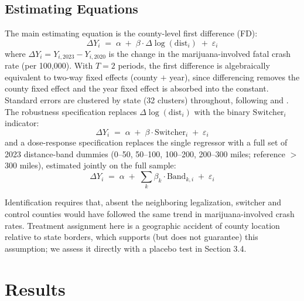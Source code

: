 \documentclass[11pt]{article}
\begin{document}
\subsection{Estimating Equations}

The main estimating equation is the county-level first difference
(FD):
\begin{equation}
  \Delta Y_i \;=\; \alpha \;+\; \beta \cdot \Delta\log(\mathrm{dist}_i) \;+\; \varepsilon_i
  \label{eq:main}
\end{equation}
where $\Delta Y_i = Y_{i,2023} - Y_{i,2020}$ is the change in the
marijuana-involved fatal crash rate (per 100,000). With $T=2$ periods,
the first difference is algebraically equivalent to two-way fixed
effects (county $+$ year), since differencing removes the county
fixed effect and the year fixed effect is absorbed into the constant.
Standard errors are clustered by state (32 clusters) throughout,
following \citet{BertrandDufloMullainathan2004} and
\citet{CameronMiller2015}. The robustness specification replaces
$\Delta\log(\mathrm{dist}_i)$ with the binary $\mathrm{Switcher}_i$
indicator:
\begin{equation}
  \Delta Y_i \;=\; \alpha \;+\; \beta \cdot \mathrm{Switcher}_i \;+\; \varepsilon_i
  \label{eq:binary}
\end{equation}
and a dose-response specification replaces the single regressor with
a full set of 2023 distance-band dummies (0--50, 50--100, 100--200,
200--300 miles; reference $>$300 miles), estimated jointly on the full
sample:
\begin{equation}
  \Delta Y_i \;=\; \alpha \;+\; \sum_{k} \beta_k \cdot \mathrm{Band}_{k,i} \;+\; \varepsilon_i
  \label{eq:dose}
\end{equation}

Identification requires that, absent the neighboring legalization,
switcher and control counties would have followed the same trend in
marijuana-involved crash rates. Treatment assignment here is a
geographic accident of county location relative to state borders,
which supports (but does not guarantee) this assumption; we assess it
directly with a placebo test in Section 3.4.

\section{Results}
\end{document}
